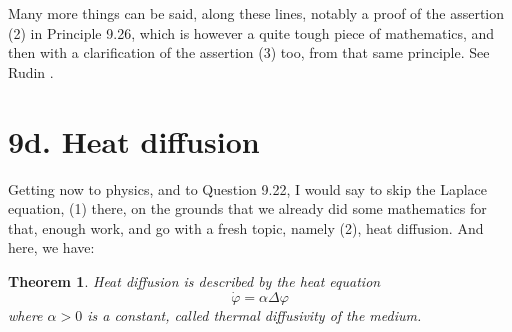 \documentclass[12pt]{amsbook}
\newtheorem{theorem}{Theorem}[chapter]
\begin{document}
Many more things can be said, along these lines, notably a proof of the assertion (2) in Principle 9.26, which is however a quite tough piece of mathematics, and then with a clarification of the assertion (3) too, from that same principle. See Rudin \cite{rud}.

\section*{9d. Heat diffusion}

Getting now to physics, and to Question 9.22, I would say to skip the Laplace equation, (1) there, on the grounds that we already did some mathematics for that, enough work, and go with a fresh topic, namely (2), heat diffusion. And here, we have:


\begin{theorem}
Heat diffusion is described by the heat equation
$$\dot{\varphi}=\alpha\Delta\varphi$$
where $\alpha>0$ is a constant, called thermal diffusivity of the medium.
\end{theorem}
\end{document}
